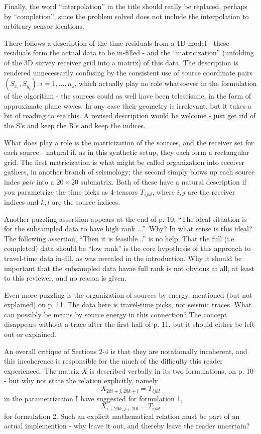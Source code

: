 Finally, the word ``interpolation'' in the title should really be replaced, perhaps by ``completion'', since the problem solved does not include the interpolation to arbitrary sensor locations.

There follows a description of the time residuals from a 1D model - these residuals form the actual data to be in-filled - and the ``matricization'' (unfolding of the 3D survey receiver grid into a matrix) of this data. The description is rendered unnecessarily confusing by the consistent use of source coordinate pairs $(S_{x_i},S_{y_i}): i=1,...,n_s$, which actually play no role whatsoever in the formulation of the algorithm - the sources could as well have been teleseismic, in the form of approximate plane waves. In any case their geometry is irrelevant, but it takes a bit of reading to see this. A revised description would be welcome - just get rid of the S's and keep the R's and keep the indices.

What does play a role is the matricization of the sources, and the receiver set for each source - natural if, as in this synthetic setup, they each form a rectangular grid. The first matricization is what might be called organization into receiver gathers, in another branch of seismology; the second simply blows up each source indes {\em pair} into a $20 \times 20$ submatrix. Both of these have a natural description if you parametrize the time picks as 4-tensors $T_{ijkl}$, where $i,j$ are the receiver indices and $k,l$ are the source indices.

Another puzzling assertiion appears at the end of p. 10: ``The ideal situation is for the subsampled data to have high rank ...''. Why? In what sense is this ideal? The following assertion, ``Then it is feasible...'' is no help: That the full (i.e. completed) data should be ``low rank'' is the core hypothesis of this approach to travel-time data in-fill, as was revealed in the introduction. Why it should be important that the subsampled data havae full rank is not obvious at all, at least to this reviewer, and no reason is given.

Even more puzzling is the organization of sources by energy, mentioned (but not explained) on p. 11. The data here is travel-time picks, not seismic traces. What can possibly be means by source energy in this connection? The concept disappears without a trace after the first half of p. 11, but it should either be left out or explained.

An overall critique of Sections 2-4 is that they are notationally incoherent, and this incoherence is responsible for the much of the difficulty this reader experienced. The matrix $X$ is described verbally in its two formulations, on p. 10 - but why not state the relation explicitly, namely
\[
X_{20i+j,20k+l} = T_{ijkl}
\]
in the parametrization I have suggested for formulation 1,
\[
X_{i+20k,j+20l}= T_{ijkl}
\]
for formulation 2. Such an explicit mathematical relation must be part of an actual implemention - why leave it out, and thereby leave the reader uncertain?

